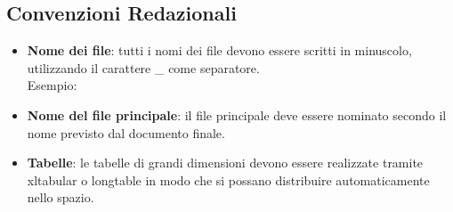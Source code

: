 \subsection{Convenzioni Redazionali}
\begin{itemize}
	\item \textbf{Nome dei file}: tutti i nomi dei file devono essere scritti in minuscolo, utilizzando il carattere \_ come separatore. \\
	Esempio: 
	\item \textbf{Nome del file principale}: il file principale deve essere nominato secondo il nome previsto dal documento finale.
	\item \textbf{Tabelle}: le tabelle di grandi dimensioni devono essere realizzate tramite xltabular o longtable in modo che si possano distribuire automaticamente nello spazio. 
\end{itemize}